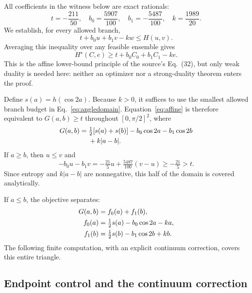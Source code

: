 \documentclass[aps,pra,reprint,amsmath,amssymb,longbibliography,nofootinbib]{revtex4-2}
\newcommand{\Hs}{H^{\star}}
\begin{document}
All coefficients in the witness below are exact rationals:
\begin{equation}
 t=-\frac{211}{50},\quad b_0=\frac{5907}{100},\quad
 b_1=-\frac{5487}{100},\quad k=\frac{1989}{20}.
 \label{eq:coeff}
\end{equation}
We establish, for every allowed branch,
\begin{equation}
 t+b_0u+b_1v-kw\leq H(u,v).
 \label{eq:affine}
\end{equation}
Averaging this inequality over any feasible ensemble gives
\begin{equation}
 \Hs(C,e)\geq t+b_0C_0+b_1C_1-ke.
 \label{eq:weakdual}
\end{equation}
This is the affine lower-bound principle of the source's Eq.~(32), but
only weak duality is needed here: neither an optimizer nor a strong-duality
theorem enters the proof.

Define $s(a)=h(\cos 2a)$. Because $k>0$, it suffices to use the smallest
allowed branch budget in Eq.~\eqref{eq:angledomain}. Equation~\eqref{eq:affine}
is therefore equivalent to $G(a,b)\geq t$ throughout $[0,\pi/2]^2$, where
\begin{align}
 G(a,b)={}&\tfrac12[s(a)+s(b)]-b_0\cos2a-b_1\cos2b\notag\\
 &+k|a-b|.\label{eq:G}
\end{align}
If $a\geq b$, then $u\leq v$ and
\begin{equation}
 -b_0u-b_1v=-\tfrac{21}{5}u+\tfrac{5487}{100}(v-u)
 \geq-\tfrac{21}{5}>t.
\end{equation}
Since entropy and $k|a-b|$ are nonnegative, this half of the domain is
covered analytically.

If $a\leq b$, the objective separates:
\begin{align}
 G(a,b)&=f_0(a)+f_1(b),\label{eq:sep}\\
 f_0(a)&=\tfrac12s(a)-b_0\cos2a-ka,\notag\\
 f_1(b)&=\tfrac12s(b)-b_1\cos2b+kb.\notag
\end{align}
The following finite computation, with an explicit continuum correction,
covers this entire triangle.

\subsection{Endpoint control and the continuum correction}
\end{document}
